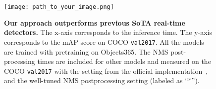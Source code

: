 \begin{figure}[h]
    \centering
    \texttt{[image: path\_to\_your\_image.png]}
    \caption{\textbf{Our approach outperforms previous SoTA real-time detectors.} The x-axis corresponds to the inference time. The y-axis corresponds to the mAP score on COCO \texttt{val2017}. All the models are trained with pretraining on Objects365. The NMS post-processing times are included for other models and measured on the COCO \texttt{val2017} with the setting from the official implementation~\cite{lyu2022rtmdet,yolov8_ultralytics,supergradients}, and the well-tuned NMS postprocessing setting (labeled as ``*'').}
    \label{fig:main_result}
\end{figure}